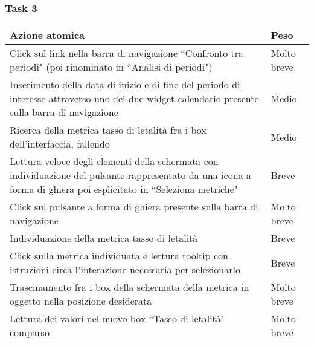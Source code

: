 \subsubsection{Task 3}
\label{sss:iaa-task-3}

{
\renewcommand{\arraystretch}{2}
\begin{longtable}[h]{| p{14cm} | p{2.5cm} |}
    \hline
    \textbf{Azione atomica} & \textbf{Peso} \\
    \hline
    \endhead
    Click sul link nella barra di navigazione ``Confronto tra periodi" (poi rinominato in ``Analisi di periodi") & Molto breve \\
    \hline
    Inserimento della data di inizio e di fine del periodo di interesse attraverso uno dei due widget calendario presente sulla barra di navigazione & Medio \\
    \hline
    Ricerca della metrica tasso di letalità fra i box dell'interfaccia, fallendo & Medio \\
    \hline
    Lettura veloce degli elementi della schermata con individuazione del pulsante rappresentato da una icona a forma di ghiera poi esplicitato in ``Seleziona metriche" & Breve \\
    \hline
    Click sul pulsante a forma di ghiera presente sulla barra di navigazione & Molto breve \\
    \hline
    Individuazione della metrica tasso di letalità & Breve \\
    \hline
    Click sulla metrica individuata e lettura tooltip con istruzioni circa l'interazione necessaria per selezionarlo & Breve \\
    \hline
    Trascinamento fra i box della schermata della metrica in oggetto nella posizione desiderata & Molto breve \\
    \hline
    Lettura dei valori nel nuovo box ``Tasso di letalità" comparso & Molto breve \\
    \hline
\end{longtable}
}
